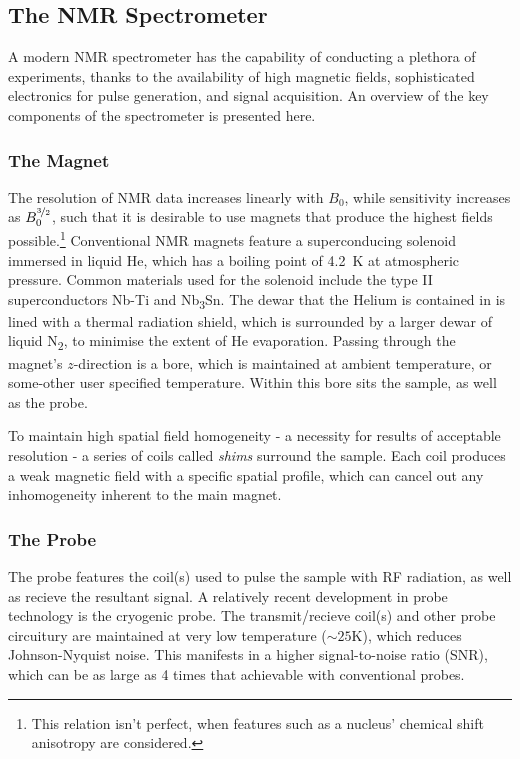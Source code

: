 \subsection{The NMR Spectrometer}
A modern \ac{NMR} spectrometer has the capability of conducting a plethora of
experiments, thanks to the availability of high magnetic fields, sophisticated
electronics for pulse generation, and signal acquisition. An overview of the
key components of the spectrometer is presented here.

\subsubsection{The Magnet}
The resolution of \ac{NMR} data increases linearly with $B_0$, while sensitivity
increases as $B_0^{\nicefrac{3}{2}}$\cite{Abragam1961}, such that it is
desirable to use magnets that produce the highest fields
possible.\footnote{This relation isn't perfect, when features such as a
nucleus' chemical shift anisotropy are considered.} Conventional NMR magnets
feature a superconducing solenoid immersed in liquid He, which has a boiling
point of \qty{4.2}{\kelvin} at atmospheric pressure. Common materials used
for the solenoid include the type II superconductors Nb-Ti and
Nb\textsubscript{3}Sn. The dewar that the Helium is contained in is lined with
a thermal radiation shield, which is surrounded by a larger dewar of liquid
N\textsubscript{2}, to minimise the extent of He evaporation. Passing through
the magnet's $z$-direction is a bore, which is maintained at ambient
temperature, or some-other user specified temperature. Within this bore sits
the sample, as well as the probe.

To maintain high spatial field homogeneity - a necessity for results of
acceptable resolution - a series of coils called \textit{shims} surround the
sample. Each coil produces a weak magnetic field with a specific spatial
profile, which can cancel out any inhomogeneity inherent to the main magnet.

\subsubsection{The Probe}
The probe features the coil(s) used to pulse the sample with \ac{RF} radiation, as
well as recieve the resultant signal. A relatively recent development in probe
technology is the cryogenic probe\cite{Styles1984, Styles1989, Kovacs2005}. The
transmit/recieve coil(s) and other probe circuitury are maintained at very low
temperature ($\sim \num{25} \si{\kelvin}$), which reduces Johnson-Nyquist
noise. This manifests in a higher signal-to-noise ratio (SNR), which can be as
large as 4 times that achievable with conventional probes.

